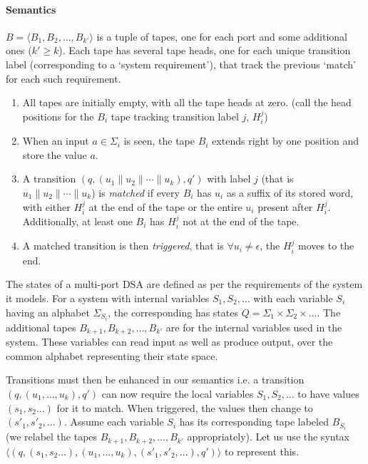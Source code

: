 \paragraph*{Semantics} $B=\langle B_1,B_2,\dots,B_{k'} \rangle$ is a tuple of tapes, one for each port and some additional ones ($k'\ge k$). Each tape has several tape heads, one for each unique transition label (corresponding to a `system requirement'), that track the previous `match' for each such requirement. 

\begin{enumerate}
\item All tapes are initially empty, with all the tape heads at zero. (call the head positions for the $B_i$ tape tracking transition label $j$, $H_{i}^{j}$)

\item When an input $a \in \Sigma_i$ is seen, the tape $B_i$ extends right by one position and store the value $a$.

\item A transition $(q, (u_1 \parallel u_2 \parallel \cdots \parallel u_k), q')$ with label $j$ (that is $u_1 \parallel u_2 \parallel \cdots \parallel u_k$) is \emph{matched} if every $B_i$ has $u_i$ as a suffix of its stored word, with either $H_{i}^{j}$ at the end of the tape or the entire $u_i$ present after $H_{i}^{j}$. Additionally, at least one $B_i$ has $H_{i}^{j}$ not at the end of the tape.

\item A matched transition is then \emph{triggered}, that is $\forall u_i \ne \epsilon$, the $H_{i}^{j}$ moves to the end. 
\end{enumerate}

The states of a multi-port DSA are defined as per the requirements of the system it models. For a system with internal variables $S_1,S_2,\dots$ with each variable $S_i$ having an alphabet $\Sigma_{S_i}$, the corresponding \mdsa has states $Q=\Sigma_1 \times \Sigma_2 \times \dots$. The additional tapes $B_{k+1}, B_{k+2}, \dots, B_{k'}$ are for the internal variables used in the system. These variables can read input as well as produce output, over the common alphabet representing their state space. %

Transitions must then be enhanced in our semantics i.e.  a transition $(q, (u_1, \dots, u_k), q')$ can now require the local variables $S_1, S_2,\dots$ to have values $(s_1, s_2 \dots)$  for it to match. When triggered, the values then change to $(s'_1,s'_2,\dots)$. Assume each variable $S_i$ has its corresponding tape labeled $B_{S_i}$ (we relabel the tapes $B_{k+1}, B_{k+2}, \dots, B_{k'}$ appropriately). Let us use the syntax $\langle (q, (s_1, s_2 \dots), (u_1, \dots, u_k), (s'_1,s'_2,\dots), q') \rangle$ to represent this.

